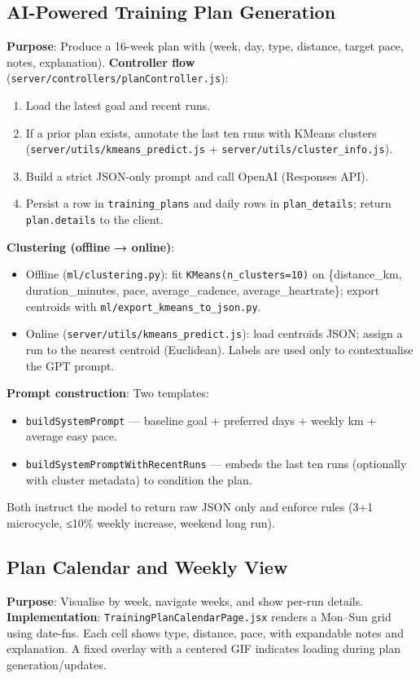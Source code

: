 \subsection{AI-Powered Training Plan Generation}
\textbf{Purpose}: Produce a 16-week plan with (week, day, type, distance, target pace, notes, explanation).
\newline
\textbf{Controller flow} (\verb|server/controllers/planController.js|):
\begin{enumerate}
  \item Load the latest goal and recent runs.
  \item If a prior plan exists, annotate the last ten runs with KMeans clusters (\verb|server/utils/kmeans_predict.js| + \verb|server/utils/cluster_info.js|).
  \item Build a strict JSON-only prompt and call OpenAI (Responses API).
  \item Persist a row in \verb|training_plans| and daily rows in \verb|plan_details|; return \verb|plan.details| to the client.
\end{enumerate}

\textbf{Clustering (offline → online)}:
\begin{itemize}
  \item Offline (\verb|ml/clustering.py|): fit \verb|KMeans(n_clusters=10)| on \{distance\_km, duration\_minutes, pace, average\_cadence, average\_heartrate\}; export centroids with \verb|ml/export_kmeans_to_json.py|.
  \item Online (\verb|server/utils/kmeans_predict.js|): load centroids JSON; assign a run to the nearest centroid (Euclidean). Labels are used only to contextualise the GPT prompt.
\end{itemize}

\textbf{Prompt construction}: Two templates:
\begin{itemize}
  \item \verb|buildSystemPrompt| — baseline goal + preferred days + weekly km + average easy pace.
  \item \verb|buildSystemPromptWithRecentRuns| — embeds the last ten runs (optionally with cluster metadata) to condition the plan.
\end{itemize}
Both instruct the model to return raw JSON only and enforce rules (3+1 microcycle, ≤10\% weekly increase, weekend long run).

\subsection{Plan Calendar and Weekly View}
\textbf{Purpose}: Visualise by week, navigate weeks, and show per-run details.
\newline
\textbf{Implementation}: \verb|TrainingPlanCalendarPage.jsx| renders a Mon–Sun grid using date-fns. Each cell shows type, distance, pace, with expandable notes and explanation. A fixed overlay with a centered GIF indicates loading during plan generation/updates.

